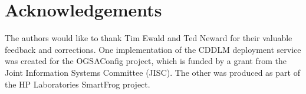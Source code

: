\section{Acknowledgements}
The authors would like to thank Tim Ewald and Ted Neward for their
valuable feedback and corrections. One implementation of the CDDLM
deployment service was created for the OGSAConfig project, which is
funded by a grant from the Joint Information Systems Committee
(JISC). The other was produced as part of the HP Laboratories
SmartFrog project.
